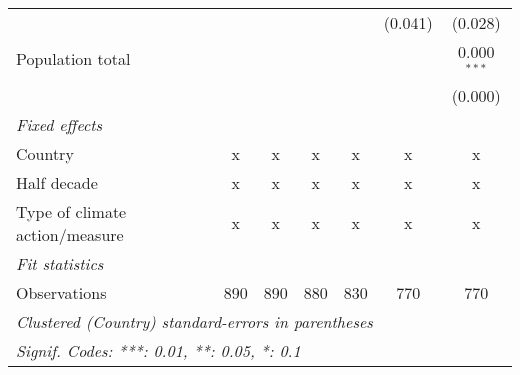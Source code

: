 \begin{tabular}{lcccccc}
                                        &         &         &         &                & (0.041)        & (0.028)\\   
   Population total                     &         &         &         &                &                & 0.000$^{***}$\\   
                                        &         &         &         &                &                & (0.000)\\   
   \emph{Fixed effects}\\
   Country                              & x       & x       & x       & x              & x              & x\\  
   Half decade                          & x       & x       & x       & x              & x              & x\\  
   Type of climate action/measure       & x       & x       & x       & x              & x              & x\\  
   \midrule \emph{Fit statistics}\\
   Observations                         & 890     & 890     & 880     & 830            & 770            & 770\\  
   \midrule
   \multicolumn{7}{l}{\emph{Clustered (Country) standard-errors in parentheses}}\\
   \multicolumn{7}{l}{\emph{Signif. Codes: ***: 0.01, **: 0.05, *: 0.1}}\\
\end{tabular}
\par\endgroup



